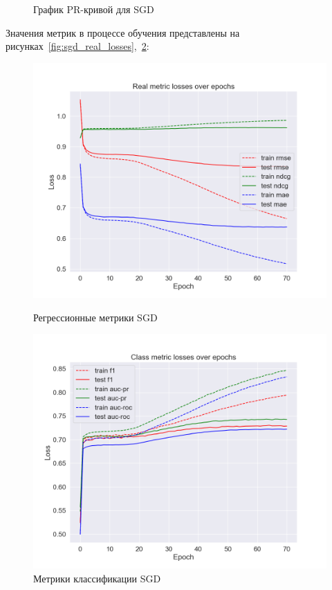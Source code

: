 \begin{figure}[h!]
\begin{minipage}{.5\textwidth}
\caption{График PR-кривой для SGD}
\label{fig:sgd_pr}
\end{minipage}
\end{figure}

Значения метрик в процессе обучения представлены на рисунках~\ref{fig:sgd_real_losses},~\ref{fig:sgd_class_losses}:

\begin{figure}[h!]
\centering
\begin{minipage}{.5\textwidth}
\centering
\includegraphics[width=1.0\linewidth]{images/sgd/real_losses}
\caption{Регрессионные метрики SGD}
\label{fig:sgd_real_losses}
\end{minipage}%
\begin{minipage}{.5\textwidth}
\centering
\includegraphics[width=1.0\linewidth]{images/sgd/class_losses}
\caption{Метрики классификации SGD}
\label{fig:sgd_class_losses}
\end{minipage}
\end{figure}

